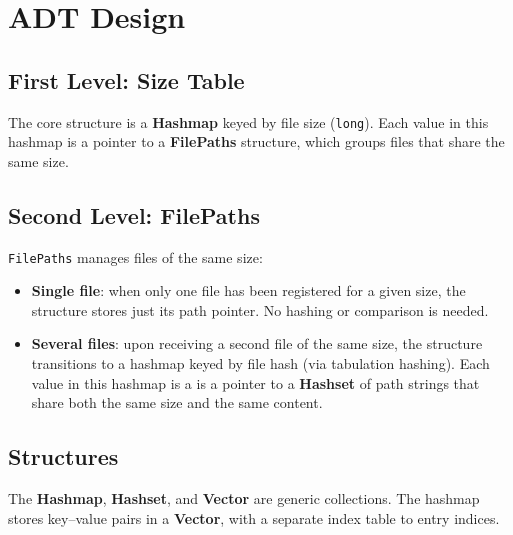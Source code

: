 \section{ADT Design}

\subsection{First Level: Size Table}

The core structure is a \textbf{Hashmap} keyed by file size (\texttt{long}).
Each value in this hashmap is a pointer to a \textbf{FilePaths} structure, which groups
files that share the same size.

\subsection{Second Level: FilePaths}

\texttt{FilePaths} manages files of the same size:
\begin{itemize}
    \item \textbf{Single file}: when only one file has been registered for a given size,
          the structure stores just its path pointer. No hashing or comparison is needed.
    \item \textbf{Several files}: upon receiving a second file of the same size, the structure
          transitions to a hashmap keyed by file hash (via tabulation hashing).
          Each value in this hashmap is a is a pointer to a \textbf{Hashset} of path strings that share
          both the same size and the same content.
\end{itemize}

\subsection{Structures}

The \textbf{Hashmap}, \textbf{Hashset}, and \textbf{Vector} are generic collections.
The hashmap stores key--value pairs in a \textbf{Vector},
with a separate index table to entry indices.
